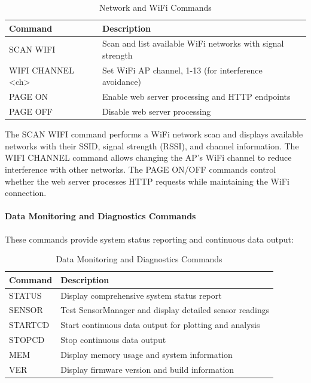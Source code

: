 \documentclass[12pt,a4paper]{article}
\begin{document}
\begin{table}[H]
\centering
\begin{tabular}{@{}ll@{}}
\toprule
\textbf{Command} & \textbf{Description} \\
\midrule
SCAN WIFI & Scan and list available WiFi networks with signal strength \\
WIFI CHANNEL <ch> & Set WiFi AP channel, 1-13 (for interference avoidance) \\
PAGE ON & Enable web server processing and HTTP endpoints \\
PAGE OFF & Disable web server processing \\
\bottomrule
\end{tabular}
\caption{Network and WiFi Commands}
\end{table}

The SCAN WIFI command performs a WiFi network scan and displays available networks with their SSID, signal strength (RSSI), and channel information. The WIFI CHANNEL command allows changing the AP's WiFi channel to reduce interference with other networks. The PAGE ON/OFF commands control whether the web server processes HTTP requests while maintaining the WiFi connection.

\paragraph{Data Monitoring and Diagnostics Commands}
These commands provide system status reporting and continuous data output:

\begin{table}[H]
\centering
\begin{tabular}{@{}ll@{}}
\toprule
\textbf{Command} & \textbf{Description} \\
\midrule
STATUS & Display comprehensive system status report \\
SENSOR & Test SensorManager and display detailed sensor readings \\
STARTCD & Start continuous data output for plotting and analysis \\
STOPCD & Stop continuous data output \\
MEM & Display memory usage and system information \\
VER & Display firmware version and build information \\
\bottomrule
\end{tabular}
\caption{Data Monitoring and Diagnostics Commands}
\end{table}
\end{document}
